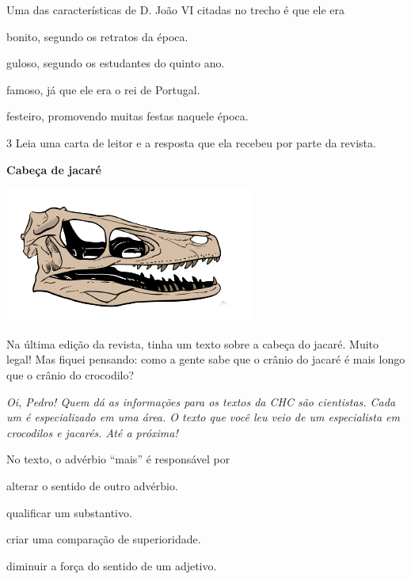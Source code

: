 Uma das características de D. João VI citadas no trecho é que ele era

\begin{escolha}[itemsep=-5pt]
\item bonito, segundo os retratos da época.

\item guloso, segundo os estudantes do quinto ano.

\item famoso, já que ele era o rei de Portugal.

\item festeiro, promovendo muitas festas naquele época.
\end{escolha}



\num{3} Leia uma carta de leitor e a resposta que ela recebeu por parte da revista.

\begin{myquote}
\textbf{Cabeça de jacaré}

\begin{center}
\includegraphics[width=.5\textwidth]{./media/image23c.png}
\end{center}

Na última edição da revista, tinha um texto sobre a cabeça do jacaré.
Muito legal! Mas fiquei pensando: como a gente sabe que o crânio do jacaré
é mais longo que o crânio do crocodilo?

\textit{Oi, Pedro! Quem dá as informações para os textos da CHC são cientistas.
Cada um é especializado em uma área. O texto que você leu veio de um
especialista em crocodilos e jacarés. Até a próxima!}

\end{myquote}

No texto, o advérbio ``mais'' é responsável por

\begin{escolha}[itemsep=-5pt]
\item alterar o sentido de outro advérbio.

\item qualificar um substantivo.

\item criar uma comparação de superioridade.

\item diminuir a força do sentido de um adjetivo.
\end{escolha}


